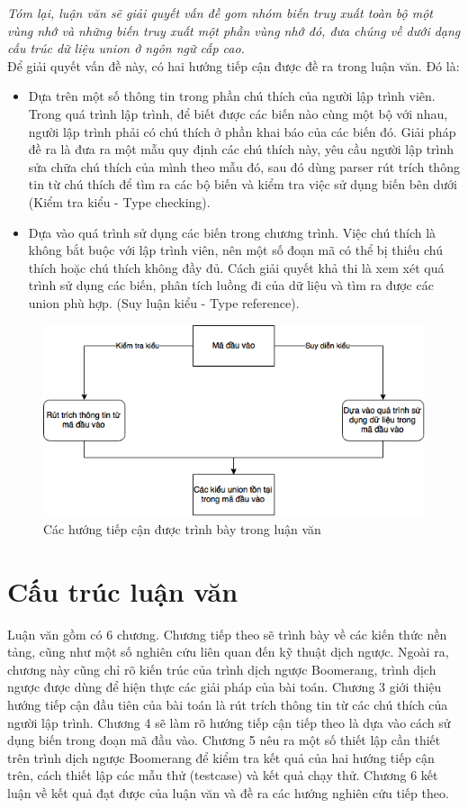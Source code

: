 \textit{Tóm lại, luận văn sẽ giải quyết vấn đề gom nhóm biến truy xuất toàn bộ một vùng nhớ và những biến truy xuất một phần vùng nhớ đó, đưa chúng về dưới dạng cấu trúc dữ liệu union ở ngôn ngữ cấp cao.}\\

Để giải quyết vấn đề này, có hai hướng tiếp cận được đề ra trong luận văn. Đó là:
\begin{itemize}
	\item Dựa trên một số thông tin trong phần chú thích của người lập trình viên. Trong quá trình lập trình, để biết được các biến nào cùng một bộ với nhau, người lập trình phải có chú thích ở phần khai báo của các biến đó. Giải pháp đề ra là đưa ra một mẫu quy định các chú thích này, yêu cầu người lập trình sửa chữa chú thích của mình theo mẫu đó, sau đó dùng parser rút trích thông tin từ chú thích để tìm ra các bộ biến và kiểm tra việc sử dụng biến bên dưới (Kiểm tra kiểu - Type checking).
	\item Dựa vào quá trình sử dụng các biến trong chương trình. Việc chú thích là không bắt buộc với lập trình viên, nên một số đoạn mã có thể bị thiếu chú thích hoặc chú thích không đầy đủ. Cách giải quyết khả thi là xem xét quá trình sử dụng các biến, phân tích luồng đi của dữ liệu và tìm ra được các union phù hợp. (Suy luận kiểu - Type reference).
\end{itemize}
\begin{figure}
	\centering
	\includegraphics[width=0.7\linewidth]{image/main}
	\caption{Các hướng tiếp cận được trình bày trong luận văn}
	\label{fig:main}
\end{figure}
\section{Cấu trúc luận văn}

Luận văn gồm có 6 chương. Chương tiếp theo sẽ trình bày về các kiến thức nền tảng, cũng như một số nghiên cứu liên quan đến kỹ thuật dịch ngược. Ngoài ra, chương này cũng chỉ rõ kiến trúc của trình dịch ngược Boomerang, trình dịch ngược được dùng để hiện thực các giải pháp của bài toán. Chương 3 giới thiệu hướng tiếp cận đầu tiên của bài toán là rút trích thông tin từ các chú thích của người lập trình. Chương 4 sẽ làm rõ hướng tiếp cận tiếp theo là dựa vào cách sử dụng biến trong đoạn mã đầu vào. Chương 5 nêu ra một số thiết lập cần thiết trên trình dịch ngược Boomerang để kiểm tra kết quả của hai hướng tiếp cận trên, cách thiết lập các mẫu thử (testcase) và kết quả chạy thử. Chương 6 kết luận về kết quả đạt được của luận văn và đề ra các hướng nghiên cứu tiếp theo.
	
